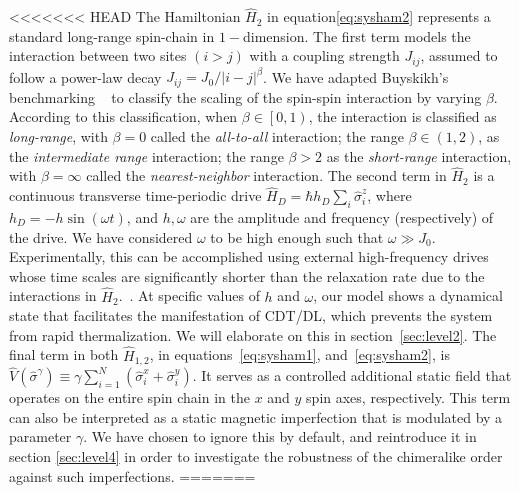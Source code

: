 \documentclass[12pt]{iopart}
\begin{document}
<<<<<<< HEAD
The Hamiltonian $\hat{H}_2$ in equation\eqref{eq:sysham2} represents a standard long-range spin-chain in $1-$dimension. The first term models the interaction between two sites $(i>j)$ with a coupling strength $J_{ij}$, assumed to follow a power-law decay $J_{ij}={J_0}/{|i-j|^\beta}$. We have adapted Buyskikh's benchmarking ~\cite{buyskikh_entanglement_2016} to classify the scaling of the spin-spin interaction by varying $\beta$. According to this classification, when $\beta\in\left[0,1\right)$, the interaction is classified as \textit{long-range}, with $\beta=0$ called the \textit{all-to-all} interaction; the range $\beta\in \left(1,2\right)$, as the \textit{ intermediate range} interaction; the range $\beta > 2$ as the \textit{ short-range} interaction, with $\beta= \infty$ called the \textit{ nearest-neighbor} interaction. The second term in $\hat{H}_2$ is a continuous transverse time-periodic drive $\displaystyle \hat{H}_D=\hbar h_D \sum_i\hat{\sigma}^z_i$, where $\displaystyle h_D = -h\sin{(\omega t)}$, and $h,\omega$ are the amplitude and frequency (respectively) of the drive. We have considered $\omega$ to be high enough such that $\omega\gg J_0$. 	Experimentally, this can be accomplished using external high-frequency drives whose time scales are significantly shorter than the relaxation rate due to the interactions in $\hat{H}_2$.~\cite{choi_observation_2017,zhang_observation_2017,Cirac_1995,Blatt_2012}. At specific values of $h$ and $\omega$, our model shows a dynamical state that facilitates the manifestation of CDT/DL, which prevents the system from rapid thermalization. We will elaborate on this in section~\ref{sec:level2}. The final term in both $\hat{H}_{1,2}$, in equations~\eqref{eq:sysham1}, and~\eqref{eq:sysham2}, is $\displaystyle \hat{V}(\hat{\sigma}^{\gamma}) \equiv\gamma  \sum_{i=1}^{N} (\hat{\sigma}^x_i + \hat{\sigma}^y_i)$. It serves as a controlled additional static field that operates on the entire spin chain in the $x$ and $y$ spin axes, respectively.  This term can also be interpreted as a static magnetic imperfection that is modulated by a parameter $\gamma$. We have chosen to ignore this by default, and reintroduce it in section \ref{sec:level4} in order to investigate the robustness of the chimeralike order against such imperfections.
=======
\end{document}
